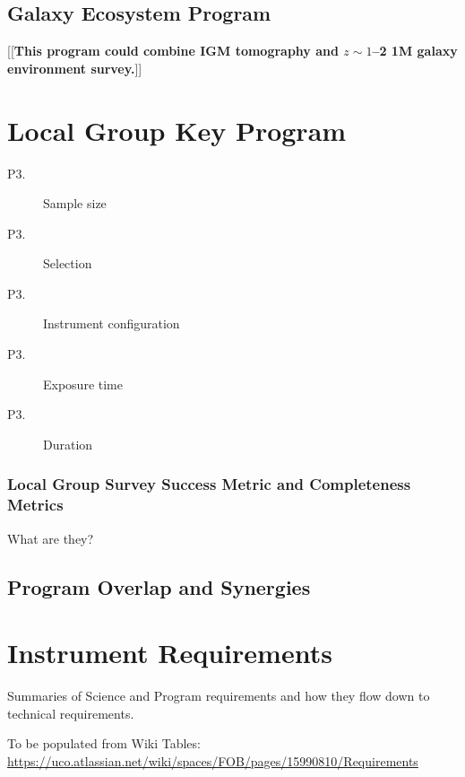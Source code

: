 \documentclass[preprint,11pt]{aastex}
\newcommand{\edit}[2][todo]{{\color{#1}[[{\bf #2}]]}}
\begin{document}
\subsection{Galaxy Ecosystem Program}\label{prog:ecosystem}

\edit{This program could combine IGM tomography and $z \sim 1$--2 1M galaxy environment survey.}

\section{Local Group Key Program}\label{prog:localgroup}

\begin{description}

\item[P3.] Sample size
\item[P3.] Selection 
\item[P3.] Instrument configuration 
\item[P3.] Exposure time
\item[P3.] Duration

\end{description}

\subsubsection{Local Group Survey Success Metric and Completeness Metrics}

What are they?

\subsection{Program Overlap and Synergies}



\section{Instrument Requirements}

Summaries of Science and Program requirements and how they flow down to technical requirements.

To be populated from Wiki Tables: \url{https://uco.atlassian.net/wiki/spaces/FOB/pages/15990810/Requirements}
\end{document}
